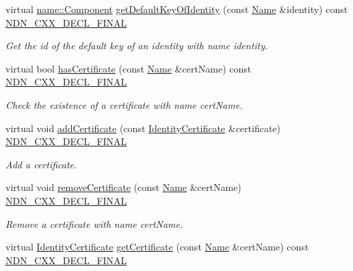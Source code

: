 \begin{DoxyCompactItemize}
virtual \hyperlink{classndn_1_1name_1_1Component}{name\+::\+Component} \hyperlink{classndn_1_1security_1_1PibSqlite3_a8482cecd5d8adee8bc0ff17fdb514b4a}{get\+Default\+Key\+Of\+Identity} (const \hyperlink{classndn_1_1Name}{Name} \&identity) const \hyperlink{ndn-cxx_2src_2common_8hpp_ab53a383abb72682805543301b5f2c244}{N\+D\+N\+\_\+\+C\+X\+X\+\_\+\+D\+E\+C\+L\+\_\+\+F\+I\+N\+AL}
\begin{DoxyCompactList}\small\item\em Get the id of the default key of an identity with name {\ttfamily identity}. \end{DoxyCompactList}\item 
virtual bool \hyperlink{classndn_1_1security_1_1PibSqlite3_a541f131f7adb92ff5d4b1aa387847789}{has\+Certificate} (const \hyperlink{classndn_1_1Name}{Name} \&cert\+Name) const \hyperlink{ndn-cxx_2src_2common_8hpp_ab53a383abb72682805543301b5f2c244}{N\+D\+N\+\_\+\+C\+X\+X\+\_\+\+D\+E\+C\+L\+\_\+\+F\+I\+N\+AL}
\begin{DoxyCompactList}\small\item\em Check the existence of a certificate with name {\ttfamily cert\+Name}. \end{DoxyCompactList}\item 
virtual void \hyperlink{classndn_1_1security_1_1PibSqlite3_a93b83169bd892d00cb1262ba155403eb}{add\+Certificate} (const \hyperlink{classndn_1_1IdentityCertificate}{Identity\+Certificate} \&certificate) \hyperlink{ndn-cxx_2src_2common_8hpp_ab53a383abb72682805543301b5f2c244}{N\+D\+N\+\_\+\+C\+X\+X\+\_\+\+D\+E\+C\+L\+\_\+\+F\+I\+N\+AL}
\begin{DoxyCompactList}\small\item\em Add a certificate. \end{DoxyCompactList}\item 
virtual void \hyperlink{classndn_1_1security_1_1PibSqlite3_a5aa737382625b9c485709b27b5bf89bb}{remove\+Certificate} (const \hyperlink{classndn_1_1Name}{Name} \&cert\+Name) \hyperlink{ndn-cxx_2src_2common_8hpp_ab53a383abb72682805543301b5f2c244}{N\+D\+N\+\_\+\+C\+X\+X\+\_\+\+D\+E\+C\+L\+\_\+\+F\+I\+N\+AL}
\begin{DoxyCompactList}\small\item\em Remove a certificate with name {\ttfamily cert\+Name}. \end{DoxyCompactList}\item 
virtual \hyperlink{classndn_1_1IdentityCertificate}{Identity\+Certificate} \hyperlink{classndn_1_1security_1_1PibSqlite3_ab533f7d3795dbcda42481337d78ec132}{get\+Certificate} (const \hyperlink{classndn_1_1Name}{Name} \&cert\+Name) const \hyperlink{ndn-cxx_2src_2common_8hpp_ab53a383abb72682805543301b5f2c244}{N\+D\+N\+\_\+\+C\+X\+X\+\_\+\+D\+E\+C\+L\+\_\+\+F\+I\+N\+AL}

\end{DoxyCompactItemize}
